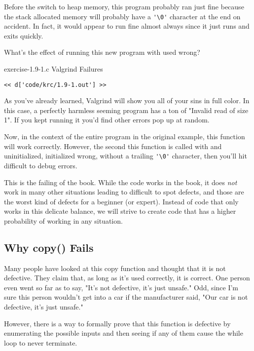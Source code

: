 Before the switch to heap memory, this program probably ran just fine
because the stack allocated memory will probably have a \verb|'\0'| character
at the end on accident.  In fact, it would appear to run fine almost always
since it just runs and exits quickly.

What's the effect of running this new program with  used wrong?

\begin{code}{exercise-1.9-1.c Valgrind Failures}
\begin{lstlisting}
<< d['code/krc/1.9-1.out'] >>
\end{lstlisting}
\end{code}

As you've already learned, Valgrind will show you all of your sins in full
color.  In this case, a perfectly harmless seeming program has a ton of
"Invalid read of size 1".  If you kept running it you'd find other errors pop
up at random.

Now, in the context of the entire program in the original \krc example, this function
will work correctly.  However, the second this function is called with
 and  uninitialized, initialized wrong, 
without a trailing \verb|'\0'| character, then you'll hit difficult to debug
errors.

This is the failing of the book.  While the code works in the book, it does
\emph{not} work in many other situations leading to difficult to spot defects,
and those are the worst kind of defects for a beginner (or expert).
Instead of code that only works in this delicate balance, we will strive to
create code that has a higher probability of working in any situation.

\subsection{Why copy() Fails}

Many people have looked at this copy function and thought that it is not
defective.  They claim that, as long as it's used correctly, it is correct.
One person even went so far as to say, "It's not defective, it's just unsafe."
Odd, since I'm sure this person wouldn't get into a car if the manufacturer
said, "Our car is not defective, it's just unsafe."

However, there is a way to formally prove that this function is defective by
enumerating the possible inputs and then seeing if any of them cause the
while loop to never terminate. 

